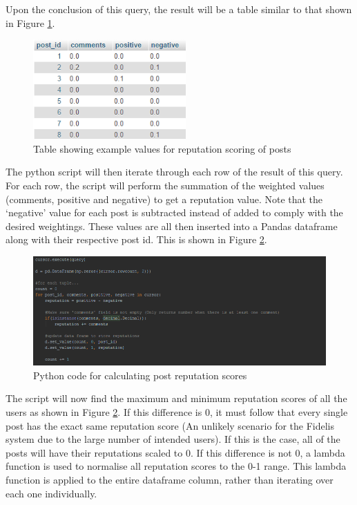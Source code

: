 Upon the conclusion of this query, the result will be a table similar to that shown in Figure \ref{fig:PostRepTable}.

\begin{figure}[H]
\centering
\includegraphics[height=1.5in]{Images/Implementation/PostRepTable}
\caption{Table showing example values for reputation scoring of posts}
\label{fig:PostRepTable}
\end{figure}

The python script will then iterate through each row of the result of this query. For each row, the script will perform the summation of the weighted values (comments, positive and negative) to get a reputation value. Note that the `negative' value for each post is subtracted instead of added to comply with the desired weightings. These values are all then inserted into a Pandas dataframe \cite{Pandas} along with their respective post id. This is shown in Figure \ref{fig:PostRepPython1}.

\begin{figure}[H]
\centering
\includegraphics[width=\linewidth]{Images/Implementation/PostRepPython1}
\caption{Python code for calculating post reputation scores}
\label{fig:PostRepPython1}
\end{figure}

The script will now find the maximum and minimum reputation scores of all the users as shown in Figure \ref{fig:PostRepPython1}. If this difference is 0, it must follow that every single post has the exact same reputation score (An unlikely scenario for the Fidelis system due to the large number of intended users). If this is the case, all of the posts will have their reputations scaled to 0. If this difference is not 0, a lambda function is used to normalise all reputation scores to the 0-1 range. This lambda function is applied to the entire dataframe column, rather than iterating over each one individually.


